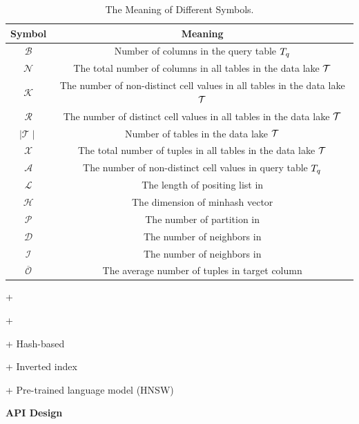 \begin{table}[!ht]
	\centering
	\caption{The Meaning of Different Symbols.}
	\begin{tabular}{cc}
		\hline
		Symbol & Meaning \\ \hline
		$\mathcal{B}$ & Number of columns in the query table $T_q$  \\
		$\mathcal{N}$ &The total number of columns in all tables in the data lake $\mathcal{T}$ \\
		$\mathcal{K}$ & The number of non-distinct cell values in all tables in the data lake $\mathcal{T}$   \\
		$\mathcal{R}$ &The number of distinct cell values in all tables in the data lake $\mathcal{T}$ \\
		$\mid \mathcal{T} \mid$ & Number of tables in the data lake $\mathcal{T}$  \\
		$\mathcal{X}$ &The total number of tuples in all tables in the data lake $\mathcal{T}$ \\
		$\mathcal{A}$ & The number of non-distinct cell values in query table $T_q$  \\
		
		$\mathcal{L}$ & The length of positing list in \josie  \\
		$\mathcal{H}$ & The dimension of minhash vector \\
		$\mathcal{P}$ & The number of partition in \lsh\\
		$\mathcal{D}$ & The number of neighbors in \dlll\\
		$\mathcal{I}$ & The number of neighbors in \infogather\\
		$\overline{\mathcal{O}}$ & The average number of tuples in target column\\






	
	\end{tabular}
	\label{symbol_table}
\end{table}

+ 

+ 

+ Hash-based

+ Inverted index 

+ Pre-trained language model (HNSW)


\noindent\textbf{API Design}

